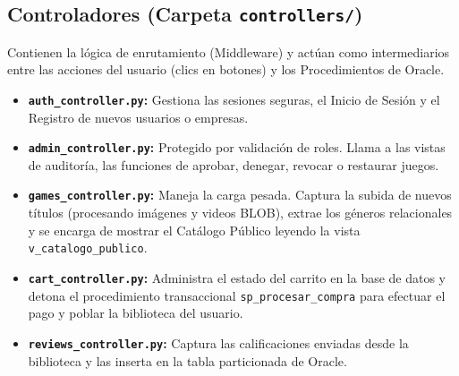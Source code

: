 \documentclass[12pt,a4paper]{article}
\begin{document}
\subsection{Controladores (Carpeta \texttt{controllers/})}
Contienen la lógica de enrutamiento (Middleware) y actúan como intermediarios entre las acciones del usuario (clics en botones) y los Procedimientos de Oracle.
\begin{itemize}
    \item \textbf{\texttt{auth\_controller.py}:} Gestiona las sesiones seguras, el Inicio de Sesión y el Registro de nuevos usuarios o empresas.
    \item \textbf{\texttt{admin\_controller.py}:} Protegido por validación de roles. Llama a las vistas de auditoría, las funciones de aprobar, denegar, revocar o restaurar juegos.
    \item \textbf{\texttt{games\_controller.py}:} Maneja la carga pesada. Captura la subida de nuevos títulos (procesando imágenes y videos BLOB), extrae los géneros relacionales y se encarga de mostrar el Catálogo Público leyendo la vista \texttt{v\_catalogo\_publico}.
    \item \textbf{\texttt{cart\_controller.py}:} Administra el estado del carrito en la base de datos y detona el procedimiento transaccional \texttt{sp\_procesar\_compra} para efectuar el pago y poblar la biblioteca del usuario.
    \item \textbf{\texttt{reviews\_controller.py}:} Captura las calificaciones enviadas desde la biblioteca y las inserta en la tabla particionada de Oracle.
\end{itemize}
\end{document}
